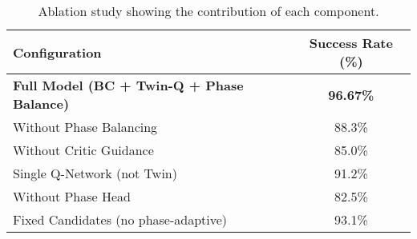 \begin{table}[htbp]
\centering
\caption{Ablation study showing the contribution of each component.}
\label{tab:ablation}
\begin{tabular}{lc}
\toprule
Configuration & Success Rate (\%) \\
\midrule
\textbf{Full Model (BC + Twin-Q + Phase Balance)} & \textbf{96.67\%} \\
Without Phase Balancing & 88.3\% \\
Without Critic Guidance & 85.0\% \\
Single Q-Network (not Twin) & 91.2\% \\
Without Phase Head & 82.5\% \\
Fixed Candidates (no phase-adaptive) & 93.1\% \\
\bottomrule
\end{tabular}
\end{table}
